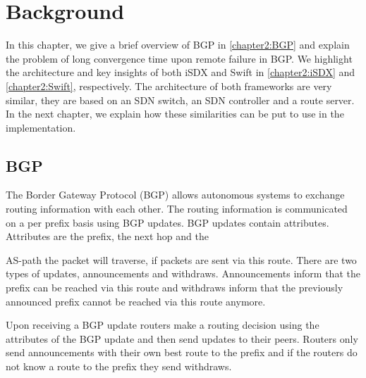 
\chapter{\label{chapter2}Background}

In this chapter, we give a brief overview of BGP in \ref{chapter2:BGP} and explain the problem of long convergence time upon remote failure in BGP. We highlight the architecture and key insights of both iSDX and Swift in \ref{chapter2:iSDX} and \ref{chapter2:Swift}, respectively. The architecture of both frameworks are very similar, they are based on an SDN switch, an SDN controller and a route server. In the next chapter, we explain how these similarities can be put to use in the implementation.

\section{\label{chapter2:BGP}BGP}

The Border Gateway Protocol (BGP) allows autonomous systems to exchange routing information with each other. The routing information is communicated on a per prefix basis using BGP updates. BGP updates contain attributes. Attributes are the prefix, the next hop and the 

AS-path the packet will traverse, if packets are sent via this route. There are two types of updates, announcements and withdraws. Announcements inform that the prefix can be reached via this route and withdraws inform that the previously announced prefix cannot be reached via this route anymore. 

Upon receiving a BGP update routers make a routing decision using the attributes of the BGP update and then send updates to their peers. Routers only send announcements with their own best route to the prefix and if the routers do not know a route to the prefix they send withdraws.

